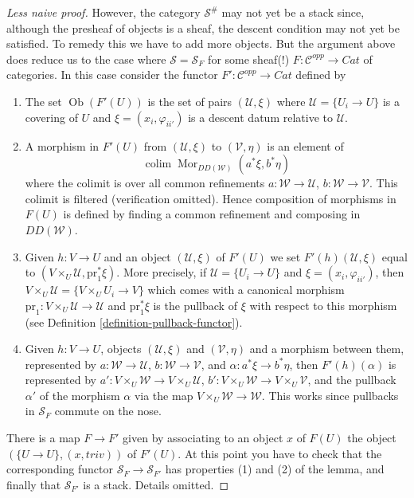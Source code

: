 \documentclass{stacks-project}
\theoremstyle{plain}
\theoremstyle{definition}
\theoremstyle{remark}
\numberwithin{equation}{subsection}
\def\colim{\mathop{\mathrm{colim}}\nolimits}
\def\Mor{\mathop{\mathrm{Mor}}\nolimits}
\def\Ob{\mathop{\mathrm{Ob}}\nolimits}
\begin{document}
\begin{proof}[Less naive proof]
\medskip\noindent
However, the category $\mathcal{S}^\#$ may not yet be a
stack since, although the presheaf of objects is a sheaf,
the descent condition may not yet be satisfied.
To remedy this we have to add more objects. But the argument
above does reduce us to the case where $\mathcal{S} = \mathcal{S}_F$
for some sheaf(!) $F : \mathcal{C}^{opp} \to \textit{Cat}$ of
categories. In this case consider the functor
$F' : \mathcal{C}^{opp} \to \textit{Cat}$ defined by
\begin{enumerate}
\item The set $\Ob(F'(U))$ is the set of pairs
$(\mathcal{U}, \xi)$ where $\mathcal{U} = \{U_i \to U\}$
is a covering of $U$ and $\xi = (x_i, \varphi_{ii'})$ is
a descent datum relative to $\mathcal{U}$.
\item A morphism in $F'(U)$ from
$(\mathcal{U}, \xi)$ to $(\mathcal{V}, \eta)$
is an element of
$$
\colim \Mor_{DD(\mathcal{W})}(a^*\xi, b^*\eta)
$$
where the colimit is over all common refinements
$a : \mathcal{W} \to \mathcal{U}$, $b : \mathcal{W} \to \mathcal{V}$.
This colimit is filtered (verification omitted).
Hence composition of morphisms in $F(U)$ is defined by
finding a common refinement and composing in $DD(\mathcal{W})$.
\item Given $h : V \to U$ and an object
$(\mathcal{U}, \xi)$ of $F'(U)$ we set $F'(h)(\mathcal{U}, \xi)$
equal to $(V \times_U \mathcal{U}, \text{pr}_1^*\xi)$.
More precisely, if $\mathcal{U} = \{U_i \to U\}$
and $\xi = (x_i, \varphi_{ii'})$, then
$V \times_U \mathcal{U} = \{V \times_U U_i \to V\}$
which comes with a canonical morphism
$\text{pr}_1 : V \times_U \mathcal{U} \to \mathcal{U}$ and
$\text{pr}_1^*\xi$ is the pullback of $\xi$ with respect to
this morphism (see Definition \ref{definition-pullback-functor}).
\item Given $h : V \to U$, objects $(\mathcal{U}, \xi)$
and $(\mathcal{V}, \eta)$ and a morphism between them, represented by
$a : \mathcal{W} \to \mathcal{U}$, $b : \mathcal{W} \to \mathcal{V}$,
and $\alpha : a^*\xi \to b^*\eta$, then $F'(h)(\alpha)$ is
represented by
$a' : V \times_U\mathcal{W} \to V \times_U\mathcal{U}$,
$b' : V \times_U\mathcal{W} \to V \times_U\mathcal{V}$,
and the pullback $\alpha'$ of the morphism $\alpha$ via
the map $V \times_U \mathcal{W} \to \mathcal{W}$. This works
since pullbacks in $\mathcal{S}_F$ commute on the nose.
\end{enumerate}
There is a map $F \to F'$ given by associating to
an object $x$ of $F(U)$ the object $(\{U \to U\}, (x, triv))$ of
$F'(U)$. At this point you have to check that the corresponding
functor $\mathcal{S}_F \to \mathcal{S}_{F'}$ has properties (1)
and (2) of the lemma, and finally that $\mathcal{S}_{F'}$ is
a stack. Details omitted.
\end{proof}
\end{document}
